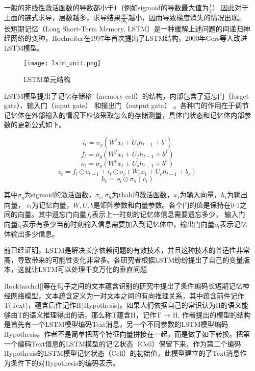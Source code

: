 一般的非线性激活函数的导数都小于1（例如sigmoid的导数最大值为$\frac{1}{4}$）,因此对于上面的链式求导，层数越多，求导结果$\frac{\partial C}{\partial b_1}$越小，因而导致梯度消失的情况出现。
长短期记忆（Long Short-Term Memory, LSTM）是一种缓解上述问题的间递归神经网络的变种，Hochreiter在1997年首次提出了LSTM结构，2000年Gers等人改进LSTM模型。

\begin{figure}[htbp]
	\centering
	\texttt{[image: lstm\_unit.png]}
	\caption[rnn_vanish]{LSTM单元结构}
\end{figure}

LSTM模型提出了记忆存储格（memory cell）的结构，内部包含了遗忘门（forget gate）、输入门（input gate） 和输出门（output gata） 。各种门的作用在于调节记忆体在外部输入的情况下应该采取怎么的存储测量，具体门状态和记忆体内部参数的更新公式如下。

\begin{equation}\label{lstm_f}i_t=\sigma_g(W^ix_t+U_ih_{t-1}+b^i)\end{equation}
\begin{equation}\label{lstm_f}f_t=\sigma_g(W^fx_t+U_fh_{t-1}+b^f)\end{equation}
\begin{equation}\label{lstm_f}o_t=\sigma_g(W^ox_t+U_oh_{t-1}+b^o)\end{equation}
\begin{equation}\label{lstm_f}c_t=f_t \odot c_{t-1}+i_t\odot \sigma_c(W_cx_t+U_ch_{t-1}+b_c)\end{equation}
\begin{equation}\label{lstm_f}h_t=o_t \odot \sigma_h(c_t)\end{equation}

其中$\sigma_g$为sigmoid的激活函数，$\sigma_c, \sigma_h$为thah的激活函数，$x_t$为输入向量，$h_t$为输出向量， $c_t$为记忆向量，$W,U,b$是矩阵参数和向量参数。各个门的值是保持在0-1之间的向量。其中遗忘门向量$f_t$表示上一时刻的记忆体信息需要遗忘多少， 输入门向量$i_t$表示有多少当前时刻输入信息需要加入到记忆体中，输出门向量$o_t$表示记忆体输出多少信息。

前已经证明，LSTM是解决长序依赖问题的有效技术，并且这种技术的普适性非常高，导致带来的可能性变化非常多。各研究者根据LSTM纷纷提出了自己的变量版本，这就让LSTM可以处理千变万化的垂直问题

Rocktaschel[]等在句子之间的文本蕴含识别的研究中提出了条件编码长短期记忆神经网络模型，文本蕴含定义为一对文本之间的有向推理关系，其中蕴含前件记作T(Text)，蕴含后件记作H(Hypothesis)。如果人们依据自己的常识认为H的语义能够由T的语义推理得出的话，那么称T蕴含H，记作T → H, 作者提出的模型的结构是首先有一个LSTM模型编码Text消息，另一个不同参数的LSTM模型编码Hypothesis。作者不是简单把两个特征向量拼接在一起，而是做了如下转换。把第一个编码Text信息的LSTM模型的记忆状态（Cell）保留下来，作为第二个编码Hypothesis的LSTM模型记忆状态（Cell）的初始值，此模型建立的了Text消息作为条件下的对Hypothesis的编码表示。

